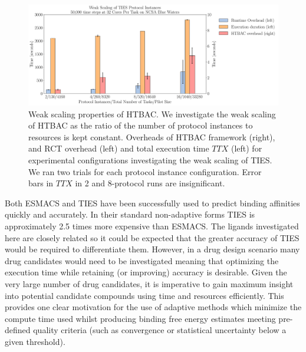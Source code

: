 \documentclass[conference]{IEEEtran}
\begin{document}
\begin{figure}
  \centering
   \includegraphics[width=\columnwidth]
   {weak_scaling_TIES_instances_50,000_timesteps_with_16_instances.pdf}
  \caption{Weak scaling properties of HTBAC. We investigate the
  weak scaling of HTBAC as the ratio of the number of protocol instances to
  resources is kept constant. Overheads of HTBAC framework (right), and RCT overhead 
  (left) and total execution time \(TTX\) (left) for experimental configurations investigating the 
  weak scaling of TIES. We ran two trials for each protocol instance 
  configuration. Error bars in \(TTX\) in 2 and 8-protocol runs are 
  insignificant.}
\label{fig:weak_scaling}
\end{figure}

Both ESMACS and TIES have been successfully used to predict binding affinities
quickly and accurately. 
In their standard non-adaptive forms TIES is approximately 2.5 times more expensive
than ESMACS.
The ligands investigated here are closely related so it could be expected that the
greater accuracy of TIES would be required to differentiate them.
However, in a drug design scenario many drug candidates would need to be investigated
meaning that optimizing the execution time while retaining (or improving) accuracy is
desirable. 
Given the very large number of drug candidates, it is imperative to
gain maximum insight into potential candidate compounds using time and
resources efficiently. 
This provides one clear motivation for the use of
adaptive methods which minimize the compute time used whilst producing binding
free energy estimates meeting pre-defined quality criteria (such as
convergence or statistical uncertainty below a given threshold).
\end{document}
